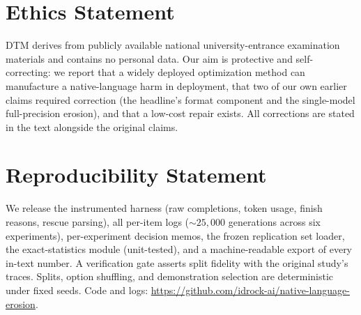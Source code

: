 \documentclass[11pt]{article}
\begin{document}
\section*{Ethics Statement}
DTM derives from publicly available national university-entrance examination
materials and contains no personal data. Our aim is protective and self-correcting:
we report that a widely deployed optimization method can manufacture a
native-language harm in deployment, that two of our own earlier claims required
correction (the headline's format component and the single-model full-precision
erosion), and that a low-cost repair exists. All corrections are stated in the text
alongside the original claims.

\section*{Reproducibility Statement}
We release the instrumented harness (raw completions, token usage, finish reasons,
rescue parsing), all per-item logs (${\sim}25{,}000$ generations across six
experiments), per-experiment decision memos, the frozen replication set loader, the
exact-statistics module (unit-tested), and a machine-readable export of every in-text
number. A verification gate asserts split fidelity with the original study's traces.
Splits, option shuffling, and demonstration selection are deterministic under fixed
seeds. Code and logs:
\url{https://github.com/idrock-ai/native-language-erosion}.


\end{document}
